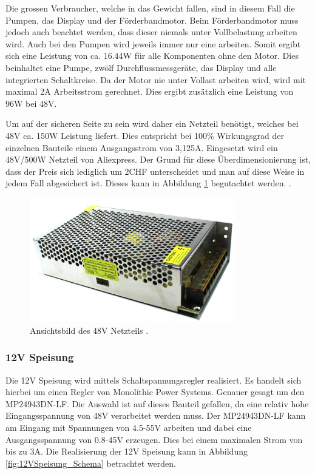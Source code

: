 Die grossen Verbraucher, welche in das Gewicht fallen, sind in diesem Fall die Pumpen, das Display und der Förderbandmotor. Beim Förderbandmotor muss jedoch auch beachtet werden, dass dieser niemals unter Vollbelastung arbeiten wird. Auch bei den Pumpen wird jeweils immer nur eine arbeiten. Somit ergibt sich eine Leistung von ca. 16.44W für alle Komponenten ohne den Motor. Dies beinhaltet eine Pumpe, zwölf Durchflussmessgeräte, das Display und alle integrierten Schaltkreise. Da der Motor nie unter Vollast arbeiten wird, wird mit maximal 2A Arbeitsstrom gerechnet. Dies ergibt zusätzlich eine Leistung von 96W bei 48V. 

Um auf der sicheren Seite zu sein wird daher ein Netzteil benötigt, welches bei 48V ca. 150W Leistung liefert. Dies entspricht bei 100\% Wirkungsgrad der einzelnen Bauteile einem Ausgangsstrom von 3,125A. Eingesetzt  wird ein 48V/500W Netzteil von Aliexpress. Der Grund für diese Überdimensionierung ist, dass der Preis sich lediglich um 2CHF unterscheidet und man auf diese Weise in jedem Fall abgesichert ist. Dieses kann in Abbildung \ref{fig:Netzteil48V} begutachtet werden. \cite{aliexpress_us_nodate}.

\begin{figure}[h!]
	\centering
	\includegraphics[width=0.8\textwidth]{graphics/Netzteil48V.png}
	\caption{Ansichtsbild des 48V Netzteils \cite{aliexpress_us_nodate}.}
	\label{fig:Netzteil48V}
\end{figure} 

\subsubsection{12V Speisung}\label{subsubsec:12V_Speisung}

Die 12V Speisung wird mittels Schaltspannungsregler realisiert. Es handelt sich hierbei um einen Regler von Monolithic Power Systems. Genauer gesagt um den MP24943DN-LF. Die Auswahl ist auf dieses Bauteil gefallen, da eine relativ hohe Eingangsspannung von 48V verarbeitet werden muss. Der MP24943DN-LF kann am Eingang mit Spannungen von 4.5-55V arbeiten und dabei eine Ausgangsspannung von 0.8-45V erzeugen. Dies bei einem maximalen Strom von bis zu 3A. Die Realisierung der 12V Speisung kann in Abbildung \ref{fig:12VSpeisung_Schema} betrachtet werden. \cite{mouser_mp24943dn-lf_nodate}

